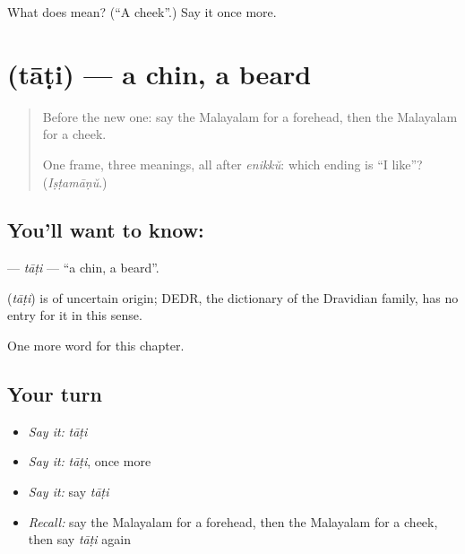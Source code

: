\begin{tcolorbox}[breakable,colback=teal!4,colframe=teal!35!black,title={Before you move on}]
What does  mean? (\textquotedblleft{}A cheek\textquotedblright{}.) Say it once more.
\end{tcolorbox}
\section[\texorpdfstring{\ml{താടി} (tāṭi)}{താടി (tāṭi)}]{ (tāṭi) — a chin, a beard}

\label{lesson:ML-C155-tati}



\begin{quote}
Before the new one: say the Malayalam for a forehead, then the Malayalam for a cheek.

One frame, three meanings, all after \emph{enikkŭ}: which ending is \textquotedblleft{}I like\textquotedblright{}? (\emph{Iṣṭamāṇŭ}.)
\end{quote}

\subsection*{You'll want to know: }
\textbf{} — \emph{tāṭi} — \textquotedblleft{}a chin, a beard\textquotedblright{}.

\begin{cousinweb}
\textbf{} (\emph{tāṭi}) is of uncertain origin; DEDR, the dictionary of the Dravidian family, has no entry for it in this sense.
\end{cousinweb}

\begin{grammarlens}[title={What you've built}]
One more word for this chapter.
\end{grammarlens}

\subsection*{Your turn}
\begin{itemize}
\raggedright
  \item \emph{Say it:} \emph{tāṭi}
  \item \emph{Say it:} \emph{tāṭi}, once more
  \item \emph{Say it:} say \emph{tāṭi}
  \item \emph{Recall:} say the Malayalam for a forehead, then the Malayalam for a cheek, then say \emph{tāṭi} again
\end{itemize}

